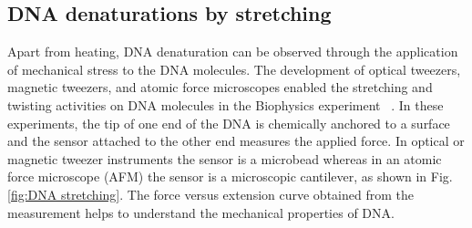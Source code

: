 \documentclass[12pt,masters,final]{UTRGVthesis}
\begin{document}
\subsection{DNA denaturations by stretching}
Apart from heating, DNA denaturation can be observed through the application of mechanical stress to the DNA molecules. The development of optical tweezers, magnetic tweezers, and atomic force microscopes enabled the stretching and twisting activities on DNA molecules  in the Biophysics experiment~\cite{Strick:2003} 
. 
In these experiments, the tip of one end of the DNA is chemically anchored to a surface and the sensor attached to the other
end measures the applied force. In optical or magnetic tweezer
instruments the sensor is a microbead whereas in an atomic force microscope (AFM) the sensor is
a microscopic cantilever, as shown in Fig.\ref{fig:DNA stretching}. The force versus extension curve obtained from the measurement helps to understand the mechanical properties of DNA. 
\end{document}
